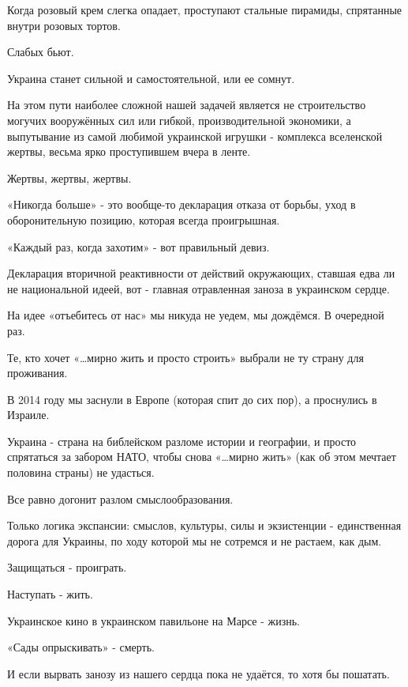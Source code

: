 Когда розовый крем слегка опадает, проступают стальные пирамиды, спрятанные внутри розовых тортов.

Слабых бьют.

Украина станет сильной и самостоятельной, или ее сомнут. 

На этом пути наиболее сложной нашей задачей является не строительство могучих
вооружённых сил или гибкой, производительной экономики, а выпутывание из самой
любимой украинской игрушки - комплекса вселенской жертвы, весьма ярко
проступившем вчера в ленте.

Жертвы, жертвы, жертвы.

«Никогда больше» - это вообще-то декларация отказа от борьбы, уход в
оборонительную позицию, которая всегда проигрышная.

«Каждый раз, когда захотим» - вот правильный девиз.

Декларация вторичной реактивности от действий окружающих, ставшая едва ли не
национальной идеей, вот - главная отравленная заноза в украинском сердце.

На идее «отъебитесь от нас» мы никуда не уедем, мы дождёмся. В очередной раз. 

Те, кто хочет «…мирно жить и просто строить» выбрали не ту страну для проживания.

В 2014 году мы заснули в Европе (которая спит до сих пор), а проснулись в Израиле.

Украина - страна на библейском разломе истории и географии, и просто спрятаться
за забором НАТО, чтобы снова «…мирно жить» (как об этом мечтает половина
страны) не удасться.

Все равно догонит разлом смыслообразования.

Только логика экспансии: смыслов, культуры, силы и экзистенции - единственная
дорога для Украины, по ходу которой мы не сотремся и не растаем, как дым.

Защищаться - проиграть.

Наступать - жить.

Украинское кино в украинском павильоне на Марсе - жизнь.

«Сады опрыскивать» - смерть.

И если вырвать занозу из нашего сердца пока не удаётся, то хотя бы пошатать.
